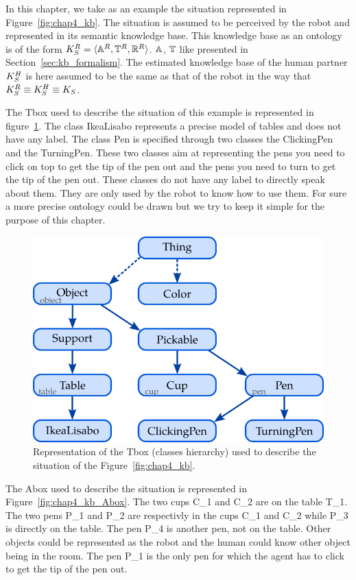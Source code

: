 In this chapter, we take as an example the situation represented in Figure~\ref{fig:chap4_kb}. The situation is assumed to be perceived by the robot and represented in its semantic knowledge base. This knowledge base as an ontology is of the form $K_S^R = \langle \mathbb{A}^R, \mathbb{T}^R, \mathbb{R}^R \rangle$. $\mathbb{A}$, $\mathbb{T}$ like presented in Section~\ref{sec:kb_formalism}. The estimated knowledge base of the human partner $K_S^H$ is here assumed to be the same as that of the robot in the way that $K_S^R \equiv K_S^H \equiv K_S$.

The Tbox used to describe the situation of this example is represented in figure~\ref{fig:chap4_kb_Tbox}. The class IkeaLisabo represents a precise model of tables and does not have any label. The class Pen is specified through two classes the ClickingPen and the TurningPen. These two classes aim at representing the pens you need to click on top to get the tip of the pen out and the pens you need to turn to get the tip of the pen out. These classes do not have any label to directly speak about them. They are only used by the robot to know how to use them. For sure a more precise ontology could be drawn but we try to keep it simple for the purpose of this chapter.

\begin{figure}[h!]
\centering
\includegraphics[scale=0.4]{figures/chapter4/pens_Tbox.png}
\caption{\label{fig:chap4_kb_Tbox} Representation of the Tbox (classes hierarchy) used to describe the situation of the Figure~\ref{fig:chap4_kb}. }
\end{figure}

The Abox used to describe the situation is represented in Figure~\ref{fig:chap4_kb_Abox}. The two cups C\_1 and C\_2 are on the table T\_1. The two pens P\_1 and P\_2 are respectivly in the cups C\_1 and C\_2 while P\_3 is directly on the table. The pen P\_4 is another pen, not on the table. Other objects could be represented as the robot and the human could know other object being in the room. The pen P\_1 is the only pen for which the agent has to click to get the tip of the pen out.


